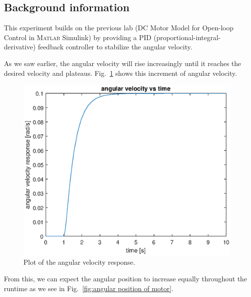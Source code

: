 \documentclass[12pt]{article}
\begin{document}
\subsection{Background information}\label{ssc:background}

This experiment builds on the previous lab (DC Motor Model for Open-loop Control in \textsc{Matlab} Simulink) by providing a PID (proportional-integral-derivative) feedback controller to stabilize the angular velocity.

As we saw earlier, the angular velocity will rise increasingly until it reaches the desired velocity and plateaus. Fig.~\ref{fig:plot of angular velocity} shows this increment of angular velocity.

\begin{figure}
    \centering
    \includegraphics[width=\linewidth]{img/task02_plot_angular_velocity.eps}
    \caption{Plot of the angular velocity response.}
    \label{fig:plot of angular velocity}
\end{figure}

From this, we can expect the angular position to increase equally throughout the runtime as we see in Fig.~\ref{fig:angular position of motor}.
\end{document}
